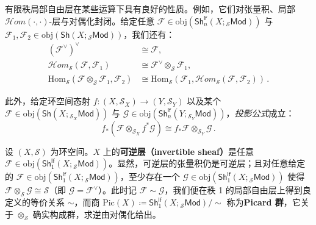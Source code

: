 \begin{Rem}\label{locallyfreeRem}
有限秩局部自由层在某些运算下具有良好的性质。例如，它们对张量积、局部 $\mathcal{H}om(\cdot,\cdot)$-层与对偶化封闭。给定任意 $\mathcal{F}\in\text{obj}(\mathsf{Sh}^\mathsf{lf}_n(X;{}_\mathcal{S}\mathsf{Mod}))$ 与 $\mathcal{F}_1,\mathcal{F}_2\in\text{obj}(\mathsf{Sh}(X;{}_\mathcal{S}\mathsf{Mod}))$，我们还有：
\begin{align*}
	(\mathcal{F}^\vee)^\vee&\cong\mathcal{F}, \\ \mathcal{H}om_{\mathcal{S}}(\mathcal{F},\mathcal{F}_1)&\cong\mathcal{F}^\vee\otimes_{\mathcal{S}}\mathcal{F}_1, \\
	\text{Hom}_{\mathcal{S}}(\mathcal{F}\otimes_{\mathcal{S}}\mathcal{F}_1,\mathcal{F}_2)&\cong\text{Hom}_{\mathcal{S}}(\mathcal{F}_1,\mathcal{H}om_{\mathcal{S}}(\mathcal{F},\mathcal{F}_2))\,.
\end{align*}

此外，给定环空间态射 $f:(X,\mathcal{S}_X)\rightarrow(Y,\mathcal{S}_Y)$ 以及某个 $\mathcal{F}\in\text{obj}(\mathsf{Sh}(X;{}_{\mathcal{S}_X}\!\mathsf{Mod}))$ 与 $\mathcal{G}\in\text{obj}(\mathsf{Sh}^\mathsf{lf}_n(Y;{}_{\mathcal{S}_Y}\mathsf{Mod}))$，\textit{投影公式}成立：
\[
f_*(\mathcal{F}\otimes_{\mathcal{S}_X}\!f^*\mathcal{G})\cong f_*\mathcal{F}\otimes_{\mathcal{S}_Y}\!\mathcal{G}\,. 
\]  
\end{Rem}

\begin{Def}\label{Picardgroup}
设 $(X,\mathcal{S})$ 为环空间。$X$ 上的\textbf{可逆层（invertible sheaf）}是任意 $\mathcal{F}\in\text{obj}(\mathsf{Sh}^\mathsf{lf}_1(X;{}_\mathcal{S}\mathsf{Mod}))$。显然，可逆层的张量积仍是可逆层；且对任意给定的 $\mathcal{F}\in\text{obj}(\mathsf{Sh}^\mathsf{lf}_1(X;{}_\mathcal{S}\mathsf{Mod}))$，至少存在一个 $\mathcal{G}\in\text{obj}(\mathsf{Sh}^\mathsf{lf}_1(X;{}_\mathcal{S}\mathsf{Mod}))$ 使得 $\mathcal{F}\otimes_\mathcal{S}\mathcal{G}\cong\mathcal{S}$（即 $\mathcal{G}=\mathcal{F}^\vee$）。此时记 $\mathcal{F}\sim\mathcal{G}$，我们便在秩 1 的局部自由层上得到良定义的等价关系 $\sim$，而商 $\text{Pic}(X)\coloneqq \mathsf{Sh}^\mathsf{lf}_1(X;{}_\mathcal{S}\mathsf{Mod})/\sim$ 称为\textbf{Picard 群}，它关于 $\otimes_\mathcal{S}$ 确实构成群，求逆由对偶化给出。
\end{Def}

